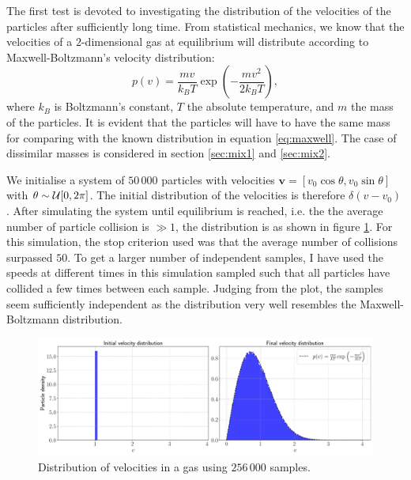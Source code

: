 The first test is devoted to investigating the distribution of the velocities of the particles after sufficiently long time. From statistical mechanics, we know that the velocities of a $2$-dimensional gas at equilibrium will distribute according to Maxwell-Boltzmann's velocity distribution: 
\begin{equation}\label{eq:maxwell}
	p(v) = \frac{mv}{k_B T} \exp{\left(- \frac{mv^2}{2 k_B T}\right)},
\end{equation}
where $k_B$ is Boltzmann's constant, $T$ the absolute temperature, and $m$ the mass of the particles. It is evident that the particles will have to have the same mass for comparing with the known distribution in equation \ref{eq:maxwell}. The case of dissimilar masses is considered in section \ref{sec:mix1} and \ref{sec:mix2}.

We initialise a system of $50\,000$ particles with velocities $\mathbf{v} = [v_0 \cos{\theta} , v_0 \sin{\theta}]$ with $\theta \sim \mathcal{U}[0,2\pi]$. The initial distribution of the velocities is therefore $\delta (v - v_0)$. After simulating the system until equilibrium is reached, i.e. the the average number of particle collision is $\gg 1$, the distribution is as shown in figure \ref{fig:dist_1}. For this simulation, the stop criterion used was that the average number of collisions surpassed $50$. To get a larger number of independent samples, I have used the speeds at different times in this simulation sampled such that all particles have collided a few times between each sample. Judging from the plot, the samples seem sufficiently independent as the distribution very well resembles the Maxwell-Boltzmann distribution.

\begin{figure}[htb]
	\centering
	\includegraphics[width=\textwidth]{../fig/distribution}
	\caption{Distribution of velocities in a gas using $256\,000$ samples.}
	\label{fig:dist_1}
\end{figure}

%

